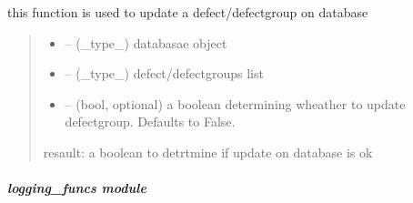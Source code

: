 \documentclass[letterpaper,10pt,english]{sphinxmanual}
\begin{document}

\begin{savenotes}\begin{fulllineitems}
\label{\detokenize{setting/backend/defect_management_funcs:oxin.backend.defect_management_funcs.update_defects_to_db}}
\pysigstartsignatures
{}
\pysigstopsignatures
\sphinxAtStartPar
this function is used to update a defect/defect\sphinxhyphen{}group on database
\begin{quote}\begin{description}
\begin{itemize}
\item {} 
\sphinxAtStartPar
{} – (\_type\_) databasae object

\item {} 
\sphinxAtStartPar
{} – (\_type\_) defect/defect\sphinxhyphen{}groups list

\item {} 
\sphinxAtStartPar
{} – (bool, optional) a boolean determining wheather to update defect\sphinxhyphen{}group. Defaults to False.

\end{itemize}

\sphinxAtStartPar
resault: a boolean to detrtmine if update on database is ok

\end{description}\end{quote}

\end{fulllineitems}\end{savenotes}


\sphinxstepscope


\subparagraph{logging\_funcs module}
\label{\detokenize{setting/backend/logging_funcs:module-oxin.backend.logging_funcs}}\label{\detokenize{setting/backend/logging_funcs:logging-funcs-module}}\label{\detokenize{setting/backend/logging_funcs::doc}}
\end{document}
